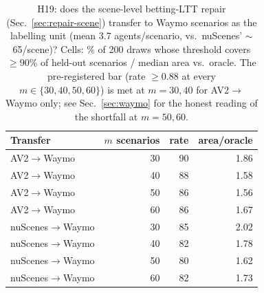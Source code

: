 \begin{table}[t]
\centering
\caption{H19: does the scene-level betting-LTT repair (Sec.~\ref{sec:repair-scene}) transfer to Waymo scenarios as the labelling unit (mean 3.7 agents/scenario, vs.\ nuScenes' $\sim$65/scene)? Cells: \% of 200 draws whose threshold covers $\ge 90\%$ of held-out scenarios / median area vs.\ oracle. The pre-registered bar (rate $\ge 0.88$ at every $m\in\{30,40,50,60\}$) is met at $m=30,40$ for AV2$\to$Waymo only; see Sec.~\ref{sec:waymo} for the honest reading of the shortfall at $m=50,60$.}
\label{tab:waymoscene}
\begin{tabular}{lrrr}
\toprule
Transfer & $m$ scenarios & rate & area/oracle \\
\midrule
AV2$\to$Waymo & 30 & 90 & 1.86 \\
AV2$\to$Waymo & 40 & 88 & 1.58 \\
AV2$\to$Waymo & 50 & 86 & 1.56 \\
AV2$\to$Waymo & 60 & 86 & 1.67 \\
nuScenes$\to$Waymo & 30 & 85 & 2.02 \\
nuScenes$\to$Waymo & 40 & 82 & 1.78 \\
nuScenes$\to$Waymo & 50 & 80 & 1.62 \\
nuScenes$\to$Waymo & 60 & 82 & 1.73 \\
\bottomrule
\end{tabular}
\end{table}
